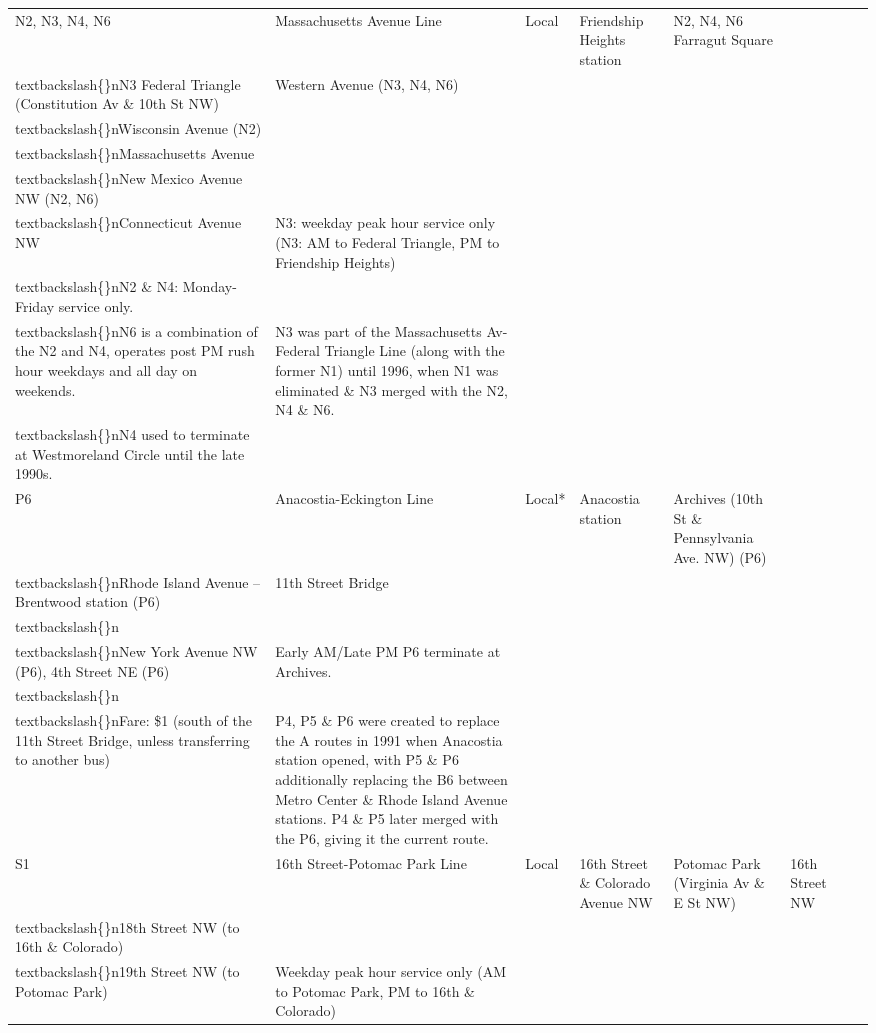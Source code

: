 \documentclass{article}
\begin{document}
\begin{tabular}{llllllll}
N2, N3, N4, N6 & Massachusetts Avenue Line & Local & Friendship Heights station & N2, N4, N6 Farragut Square\\textbackslash\{\}nN3 Federal Triangle (Constitution Av \& 10th St NW) & Western Avenue (N3, N4, N6)\\textbackslash\{\}nWisconsin Avenue (N2)\\textbackslash\{\}nMassachusetts Avenue\\textbackslash\{\}nNew Mexico Avenue NW (N2, N6)\\textbackslash\{\}nConnecticut Avenue NW & N3: weekday peak hour service only (N3: AM to Federal Triangle, PM to Friendship Heights)\\textbackslash\{\}nN2 \& N4: Monday-Friday service only.\\textbackslash\{\}nN6 is a combination of the N2 and N4, operates post PM rush hour weekdays and all day on weekends. & N3 was part of the Massachusetts Av-Federal Triangle Line (along with the former N1) until 1996, when N1 was eliminated \& N3 merged with the N2, N4 \& N6.\\textbackslash\{\}nN4 used to terminate at Westmoreland Circle until the late 1990s. \\
P6 & Anacostia-Eckington Line & Local* & Anacostia station & Archives (10th St \& Pennsylvania Ave. NW) (P6)\\textbackslash\{\}nRhode Island Avenue – Brentwood station (P6) & 11th Street Bridge\\textbackslash\{\}n\\textbackslash\{\}nNew York Avenue NW (P6), 4th Street NE (P6) & Early AM/Late PM P6 terminate at Archives.\\textbackslash\{\}n\\textbackslash\{\}nFare: \$1 (south of the 11th Street Bridge, unless transferring to another bus) & P4, P5 \& P6 were created to replace the A routes in 1991 when Anacostia station opened, with P5 \& P6 additionally replacing the B6 between Metro Center \& Rhode Island Avenue stations. P4 \& P5 later merged with the P6, giving it the current route. \\
S1 & 16th Street-Potomac Park Line & Local & 16th Street \& Colorado Avenue NW & Potomac Park (Virginia Av \& E St NW) & 16th Street NW\\textbackslash\{\}n18th Street NW (to 16th \& Colorado)\\textbackslash\{\}n19th Street NW (to Potomac Park) & Weekday peak hour service only (AM to Potomac Park, PM to 16th \& Colorado) &  \\

\end{tabular}
\end{document}
